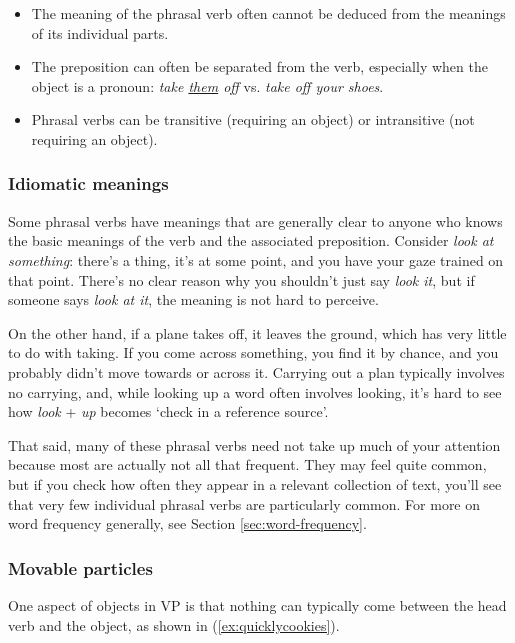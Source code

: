 \begin{itemize}
    \item The meaning of the phrasal verb often cannot be deduced from the meanings of its individual parts.
    \item The preposition can often be separated from the verb, especially when the object is a pronoun: \textit{take \uline{them} off} vs. \textit{take off your shoes}.
    \item Phrasal verbs can be transitive (requiring an object) or intransitive (not requiring an object).
\end{itemize}

\subsubsection*{Idiomatic meanings}
Some phrasal verbs have meanings that are generally clear to anyone who knows the basic meanings of the verb and the associated preposition. Consider \textit{look at something}: there's a thing, it's at some point, and you have your gaze trained on that point. There's no clear reason why you shouldn't just say \textit{look it}, but if someone says \textit{look at it}, the meaning is not hard to perceive. 

On the other hand, if a plane takes off, it leaves the ground, which has very little to do with taking. If you come across something, you find it by chance, and you probably didn't move towards or across it. Carrying out a plan typically involves no carrying, and, while looking up a word often involves looking, it's hard to see how \textit{look} + \textit{up} becomes `check in a reference source'.

That said, many of these phrasal verbs need not take up much of your attention because most are actually not all that frequent. They may feel quite common, but if you check how often they appear in a relevant collection of text, you'll see that very few individual phrasal verbs are particularly common. For more on word frequency generally, see Section \ref{sec:word-frequency}.

\subsubsection*{Movable particles}

One aspect of objects in VP is that nothing can typically come between the head verb and the object, as shown in (\ref{ex:quicklycookies}).

\ea
    \label{ex:quicklycookiesa}
    \label{ex:quicklycookiesb}
    \label{ex:quicklycookiesc}
    \label{ex:quicklycookiesd}
    \z\label{ex:quicklycookies}
\z

